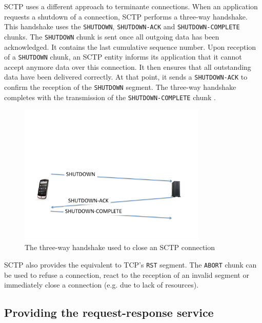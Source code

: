 SCTP uses a different approach to terminante connections. When an application requests a shutdown of a connection, SCTP performs a three-way handshake. This handshake uses the \texttt{SHUTDOWN}, \texttt{SHUTDOWN-ACK} and \texttt{SHUTDOWN-COMPLETE} chunks. The \texttt{SHUTDOWN} chunk is sent once all outgoing data has been acknowledged. It contains the last cumulative sequence number. Upon reception of a \texttt{SHUTDOWN} chunk, an SCTP entity informs its application that it cannot accept anymore data over this connection. It then ensures that all outstanding data have been delivered correctly. At that point, it sends a \texttt{SHUTDOWN-ACK} to confirm the reception of the \texttt{SHUTDOWN} segment. The three-way handshake completes with the transmission of the \texttt{SHUTDOWN-COMPLETE} chunk \cite{rfc4960}.

\begin{figure}
\begin{center}
\includegraphics[width=0.8\textwidth]{figures/mptcp-ebook/Diapositive11.pdf}
\end{center}
\caption{The three-way handshake used to close an SCTP connection}\label{fig:sctp-close}
\end{figure}

SCTP also provides the equivalent to TCP's \texttt{RST} segment. The \texttt{ABORT} chunk can be used to refuse a connection, react to the reception of an invalid segment or immediately close a connection (e.g. due to lack of resources).

\subsection{Providing the request-response service}


